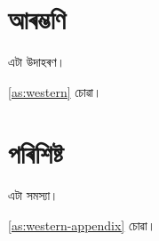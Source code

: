 \documentclass[oneside,openany]{bookbangla}
\begin{document}
\makeatletter
{}
\makeatother
\mainmatter
\chapter{আৰম্ভণি}
\begin{example}\label{as:western}এটা উদাহৰণ।\end{example}
\autoref{as:western} চোৱা।
\appendix
\setcounter{chapter}{17}
\chapter{পৰিশিষ্ট}
\begin{exercise}\label{as:western-appendix}এটা সমস্যা।\end{exercise}
\autoref{as:western-appendix} চোৱা।
\end{document}
